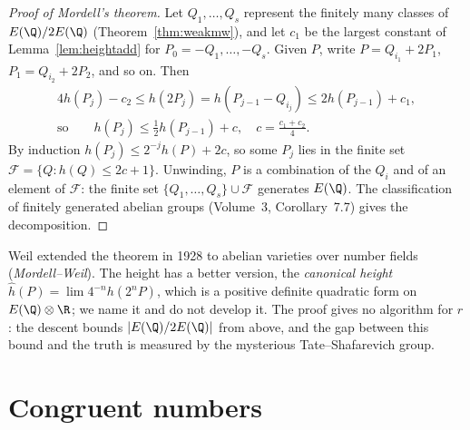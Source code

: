 \begin{proof}[Proof of Mordell's theorem]
Let $Q_1,\dots,Q_s$ represent the finitely many classes of $E(\Q)/2E(\Q)$ (Theorem~\ref{thm:weakmw}), and let $c_1$ be the largest constant of
Lemma~\ref{lem:heightadd} for $P_0=-Q_1,\dots,-Q_s$. Given $P$, write $P=Q_{i_1}+2P_1$, $P_1=Q_{i_2}+2P_2$, and so on. Then
\[
\begin{gathered}
4h(P_j)-c_2\le h(2P_j)=h(P_{j-1}-Q_{i_j})\le2h(P_{j-1})+c_1,\\
\text{so}\qquad h(P_j)\le\tfrac12h(P_{j-1})+c,\quad c=\tfrac{c_1+c_2}4.
\end{gathered}
\]
By induction $h(P_j)\le2^{-j}h(P)+2c$, so some $P_j$ lies in the finite set $\mathcal F=\{Q:h(Q)\le2c+1\}$. Unwinding, $P$ is a combination of the $Q_i$ and of an
element of $\mathcal F$: the finite set $\{Q_1,\dots,Q_s\}\cup\mathcal F$ generates $E(\Q)$. The classification of finitely generated abelian groups
(Volume~3, Corollary~7.7) gives the decomposition.
\end{proof}

\begin{remark}
Weil extended the theorem in 1928 to abelian varieties over number fields (\emph{Mordell--Weil}). The height has a better version, the \emph{canonical height}
$\hat h(P)=\lim4^{-n}h(2^nP)$, which is a positive definite quadratic form on $E(\Q)\otimes\R$; we name it and do not develop it. The proof gives no algorithm for $r$: the
descent bounds $|E(\Q)/2E(\Q)|$ from above, and the gap between this bound and the truth is measured by the mysterious Tate--Shafarevich group.
\end{remark}

\section{Congruent numbers}

